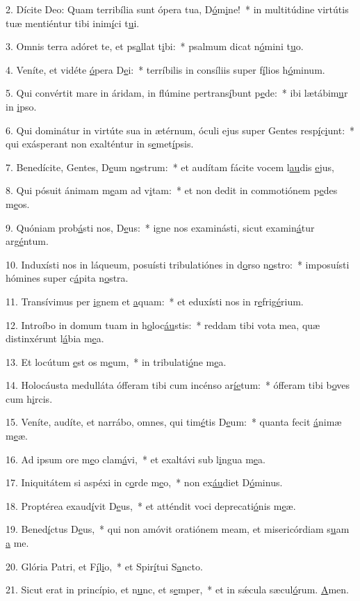 2. Dícite Deo: Quam terribília sunt ópera tua, D\uline{ó}m\uline{i}ne!~* in multitúdine virtútis tuæ mentiéntur tibi inim\uline{í}ci t\uline{u}i.\par 
3. Omnis terra adóret te, et ps\uline{a}llat t\uline{i}bi:~* psalmum dicat n\uline{ó}mini t\uline{u}o.\par 
4. Veníte, et vidéte \uline{ó}pera D\uline{e}i:~* terríbilis in consíliis super f\uline{í}lios h\uline{ó}minum.\par 
5. Qui convértit mare in áridam, in flúmine pertrans\uline{í}bunt p\uline{e}de:~* ibi lætábim\uline{u}r in \uline{i}pso.\par 
6. Qui dominátur in virtúte sua in ætérnum, óculi ejus super Gentes resp\uline{í}c\uline{i}unt:~* qui exásperant non exalténtur in s\uline{e}met\uline{í}psis.\par 
7. Benedícite, Gentes, D\uline{e}um n\uline{o}strum:~* et audítam fácite vocem l\uline{au}dis \uline{e}jus,\par 
8. Qui pósuit ánimam m\uline{e}am ad v\uline{i}tam:~* et non dedit in commotiónem p\uline{e}des m\uline{e}os.\par 
9. Quóniam prob\uline{á}sti nos, D\uline{e}us:~* igne nos examinásti, sicut examin\uline{á}tur arg\uline{é}ntum.\par 
10. Induxísti nos in láqueum, posuísti tribulatiónes in d\uline{o}rso n\uline{o}stro:~* imposuísti hómines super c\uline{á}pita n\uline{o}stra.\par 
11. Transívimus per \uline{i}gnem et \uline{a}quam:~* et eduxísti nos in r\uline{e}frig\uline{é}rium.\par 
12. Introíbo in domum tuam in h\uline{o}loc\uline{áu}stis:~* reddam tibi vota mea, quæ distinxérunt l\uline{á}bia m\uline{e}a.\par 
13. Et locútum \uline{e}st os m\uline{e}um,~* in tribulati\uline{ó}ne m\uline{e}a.\par 
14. Holocáusta medulláta ófferam tibi cum incénso ar\uline{í}\uline{e}tum:~* ófferam tibi b\uline{o}ves cum h\uline{i}rcis.\par 
15. Veníte, audíte, et narrábo, omnes, qui tim\uline{é}tis D\uline{e}um:~* quanta fecit \uline{á}nimæ m\uline{e}æ.\par 
16. Ad ipsum ore m\uline{e}o clam\uline{á}vi,~* et exaltávi sub l\uline{i}ngua m\uline{e}a.\par 
17. Iniquitátem si aspéxi in c\uline{o}rde m\uline{e}o,~* non ex\uline{áu}diet D\uline{ó}minus.\par 
18. Proptérea exaud\uline{í}vit D\uline{e}us,~* et atténdit voci deprecati\uline{ó}nis m\uline{e}æ.\par 
19. Bened\uline{í}ctus D\uline{e}us,~* qui non amóvit oratiónem meam, et misericórdiam s\uline{u}am \uline{a} me.\par 
20. Glória Patri, et F\uline{í}l\uline{i}o,~* et Spir\uline{í}tui S\uline{a}ncto.\par 
21. Sicut erat in princípio, et n\uline{u}nc, et s\uline{e}mper,~* et in sǽcula sæcul\uline{ó}rum. \uline{A}men.\par 
